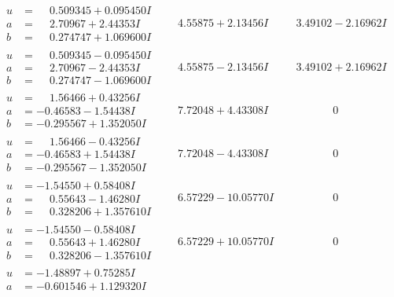 \documentclass[1p]{elsarticle_modified}
\theoremstyle{definition}
\begin{document}
$$\begin{array}{c|c|c}
 \hline 
\begin{aligned}
u &= \phantom{-}0.509345 + 0.095450 I \\
a &= \phantom{-}2.70967 + 2.44353 I \\
b &= \phantom{-}0.274747 + 1.069600 I\end{aligned}
 & \phantom{-}4.55875 + 2.13456 I & \phantom{-}3.49102 - 2.16962 I \\ \hline\begin{aligned}
u &= \phantom{-}0.509345 - 0.095450 I \\
a &= \phantom{-}2.70967 - 2.44353 I \\
b &= \phantom{-}0.274747 - 1.069600 I\end{aligned}
 & \phantom{-}4.55875 - 2.13456 I & \phantom{-}3.49102 + 2.16962 I \\ \hline\begin{aligned}
u &= \phantom{-}1.56466 + 0.43256 I \\
a &= -0.46583 - 1.54438 I \\
b &= -0.295567 + 1.352050 I\end{aligned}
 & \phantom{-}7.72048 + 4.43308 I & \phantom{-0.000000 } 0 \\ \hline\begin{aligned}
u &= \phantom{-}1.56466 - 0.43256 I \\
a &= -0.46583 + 1.54438 I \\
b &= -0.295567 - 1.352050 I\end{aligned}
 & \phantom{-}7.72048 - 4.43308 I & \phantom{-0.000000 } 0 \\ \hline\begin{aligned}
u &= -1.54550 + 0.58408 I \\
a &= \phantom{-}0.55643 - 1.46280 I \\
b &= \phantom{-}0.328206 + 1.357610 I\end{aligned}
 & \phantom{-}6.57229 - 10.05770 I & \phantom{-0.000000 } 0 \\ \hline\begin{aligned}
u &= -1.54550 - 0.58408 I \\
a &= \phantom{-}0.55643 + 1.46280 I \\
b &= \phantom{-}0.328206 - 1.357610 I\end{aligned}
 & \phantom{-}6.57229 + 10.05770 I & \phantom{-0.000000 } 0 \\ \hline\begin{aligned}
u &= -1.48897 + 0.75285 I \\
a &= -0.601546 + 1.129320 I \\

\end{aligned}
\end{array}$$
\end{document}
